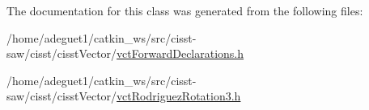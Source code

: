 The documentation for this class was generated from the following files\-:\begin{DoxyCompactItemize}
\item 
/home/adeguet1/catkin\-\_\-ws/src/cisst-\/saw/cisst/cisst\-Vector/\hyperlink{vct_forward_declarations_8h}{vct\-Forward\-Declarations.\-h}\item 
/home/adeguet1/catkin\-\_\-ws/src/cisst-\/saw/cisst/cisst\-Vector/\hyperlink{vct_rodriguez_rotation3_8h}{vct\-Rodriguez\-Rotation3.\-h}\end{DoxyCompactItemize}
